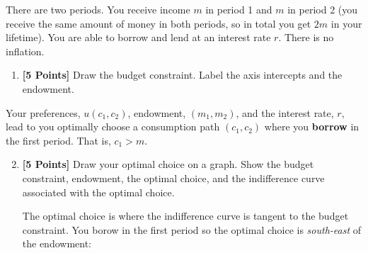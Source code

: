 \documentclass[10pt]{article}
\newcounter{question}[section]
\newenvironment{subquestions}{
  \begin{enumerate}[label=(\roman*)]}{\end{enumerate}}
\begin{document}
\medskip\noindent
There are two periods. You receive income $m$ in period 1 and $m$ in period 2 (you receive the same amount of money in both periods, so in total you get $2m$ in your lifetime). You are able to borrow and lend at an interest rate $r$. There is no inflation.
\begin{subquestions}
  \item \textbf{[5 Points]} Draw the budget constraint. Label the axis
 intercepts and the endowment.

    \textcolor{solution-color}{
    }
\end{subquestions}
Your preferences, $u\left( c_1,c_2 \right)$, endowment, $\left( m_1,m_2 \right)$, and the interest rate, $r$, lead to you optimally choose a consumption path $\left( c_1,c_2 \right)$ where you \textbf{borrow} in the first period. That is, $c_1>m$.
\begin{subquestions}
  \setcounter{enumi}{1}
  \item \textbf{[5 Points]} Draw your optimal choice on a graph. Show the
    budget constraint, endowment, the optimal choice, and the indifference
    curve associated with the optimal choice.

    \textcolor{solution-color}{
      The optimal choice is where the indifference curve is tangent to the budget
      constraint. You borow in the first period so the optimal choice is
      \emph{south-east} of the endowment:
    }

    \textcolor{solution-color}{
    }

\end{subquestions}
\end{document}
